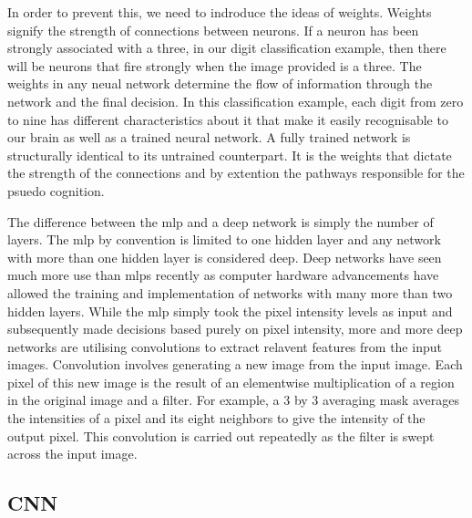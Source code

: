 \documentclass[12pt]{article}
\begin{document}
In order to prevent this, we need to indroduce the ideas of weights. Weights signify the strength of connections between neurons.
If a neuron has been strongly associated with a three, in our digit classification example, then there will be neurons that fire strongly when the image provided is a three.
The weights in any neual network determine the flow of information through the network and the final decision.
In this classification example, each digit from zero to nine has different characteristics about it that make it easily recognisable to our brain as well as a trained neural network.
A fully trained network is structurally identical to its untrained counterpart. It is the weights that dictate the strength of the connections and by extention the pathways responsible for the psuedo cognition.
\par
The difference between the mlp and a deep network is simply the number of layers.
The mlp by convention is limited to one hidden layer and any network with more than one hidden layer is considered deep.
Deep networks have seen much more use than mlps recently as computer hardware advancements have allowed the training and implementation of networks with many more than two hidden layers.
While the mlp simply took the pixel intensity levels as input and subsequently made decisions based purely on pixel intensity, more and more deep networks are utilising convolutions to extract relavent features from the input images.
Convolution involves generating a new image from the input image. Each pixel of this new image is the result of an elementwise multiplication of a region in the original image and a filter.
For example, a 3 by 3 averaging mask averages the intensities of a pixel and its eight neighbors to give the intensity of the output pixel.
This convolution is carried out repeatedly as the filter is swept across the input image.

\subsection{CNN}
\par
\end{document}
